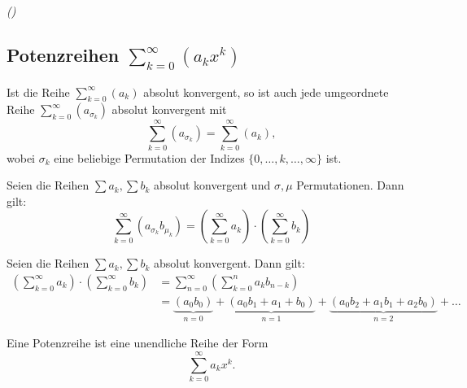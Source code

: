 
\emph{()}

\subsection{Potenzreihen $ \sum_{k=0}^\infty \left( a_k x^k \right) $}
\label{sec:potenzreihen}

\begin{theorem}
   Ist die Reihe $ \sum_{k=0}^\infty \left( a_k \right) $ absolut konvergent, so ist auch jede umgeordnete Reihe $ \sum_{k=0}^\infty \left( a_{\sigma_k} \right) $ absolut konvergent mit 
   \begin{equation*}
    \sum_{k=0}^\infty \left( a_{\sigma_k} \right) = \sum_{k=0}^\infty \left( a_k \right),
   \end{equation*}
   wobei $\sigma_k$ eine beliebige Permutation der Indizes $\{0,\ldots, k,\ldots, \infty\}$ ist.
\end{theorem}
\begin{theorem}
   Seien die Reihen $\sum a_k, \sum b_k$ absolut konvergent und $\sigma, \mu $ Permutationen. Dann gilt:
   \begin{equation*}
      \sum_{k=0}^\infty \left( a_{\sigma_k} b_{\mu_k} \right) = \left(\sum_{k=0}^{\infty} a_k \right)\cdot \left(\sum_{k=0}^{\infty} b_k \right)
   \end{equation*}
\end{theorem}
\begin{theorem}
   Seien die Reihen $\sum a_k, \sum b_k $ absolut konvergent. Dann gilt:
   \begin{align*}
      \left(\sum_{k=0}^\infty  a_k \right)\cdot\left(\sum_{k=0}^\infty  b_k\right) &= \sum_{n=0}^\infty \left(\sum_{k=0}^n  a_k b_{n-k} \right) \\
      &= \underbrace{(a_0 b_0)}_{n=0} + \underbrace{(a_0 b_1 + a_1 + b_0)}_{n=1} + \underbrace{(a_0 b_2 + a_1 b_1 + a_2 b_0)}_{n=2} + \ldots
   \end{align*}
\end{theorem}

\begin{definition}[Potenzreihe]
   Eine Potenzreihe ist eine unendliche Reihe der Form
   \begin{equation*}
   \sum_{k=0}^\infty a_k x^k.
   \end{equation*}
\end{definition} 

